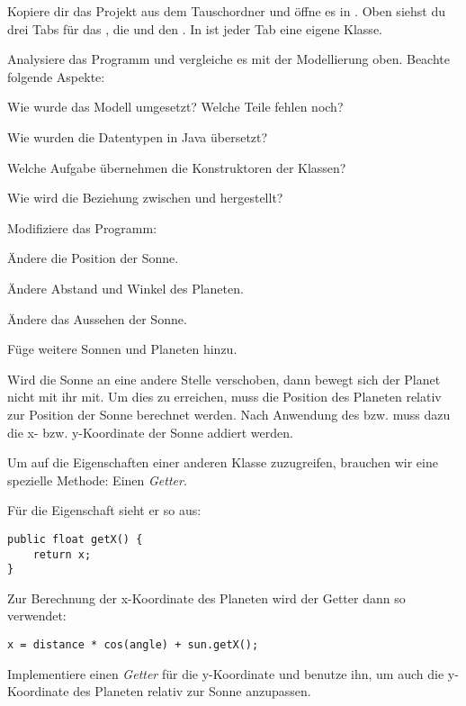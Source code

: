 \documentclass[10pt, a4paper]{arbeitsblatt}
\begin{document}
\newpage
\begin{aufgabe}
Kopiere dir das Projekt  aus dem Tauschordner und öffne es in . Oben siehst du drei Tabs für das , die  und den . In  ist jeder Tab eine eigene Klasse.


Analysiere das Programm und vergleiche es mit der Modellierung oben. Beachte folgende Aspekte:
\begin{smallitem}
	\item Wie wurde das Modell umgesetzt? Welche Teile fehlen noch?
	\item Wie wurden die Datentypen in Java übersetzt?
	\item Welche Aufgabe übernehmen die Konstruktoren der Klassen?
	\item Wie wird die Beziehung zwischen  und  hergestellt?
\end{smallitem}
\end{aufgabe}

\begin{aufgabe}
Modifiziere das Programm:
\begin{smallitem}
	\item Ändere die Position der Sonne.
	\item Ändere Abstand und Winkel des Planeten.
	\item Ändere das Aussehen der Sonne.
	\item Füge weitere Sonnen und Planeten hinzu.
\end{smallitem}
\end{aufgabe}

\begin{aufgabe}
Wird die Sonne an eine andere Stelle verschoben, dann bewegt sich der Planet nicht mit ihr mit. Um dies zu erreichen, muss die Position des Planeten relativ zur Position der Sonne berechnet werden. Nach Anwendung des  bzw.  muss dazu die x- bzw. y-Koordinate der Sonne addiert werden.

Um auf die Eigenschaften einer anderen Klasse zuzugreifen, brauchen wir eine spezielle Methode: Einen \emph{Getter}.

\begin{multicols}{2}
Für die Eigenschaft  sieht er so aus:
\begin{verbatim}
public float getX() {
	return x;
}
\end{verbatim}

Zur Berechnung der x-Koordinate des Planeten wird der Getter dann so verwendet:
\begin{verbatim}
x = distance * cos(angle) + sun.getX();
\end{verbatim}
\end{multicols}

Implementiere einen \emph{Getter} für die y-Koordinate und benutze ihn, um auch die y-Koordinate des Planeten relativ zur Sonne anzupassen.
\end{aufgabe}
\end{document}
